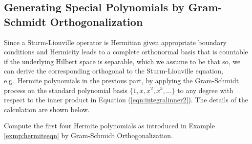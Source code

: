 \subsection{Generating Special Polynomials by Gram-Schmidt Orthogonalization}

Since a Sturm-Liouville operator is Hermitian given appropriate boundary conditions and Hermicity leads to a complete orthonormal basis that is countable if the underlying Hilbert space is separable, which we assume to be that so, we can derive the corresponding orthogonal  to the Sturm-Liouville equation, e.g.\ Hermite polynomials in the previous part, by applying the Gram-Schmidt process on the standard polynomial basis $\{1, x, x^2, x^3, \ldots\}$ to any degree with respect to the inner product in Equation (\ref{eqn:integralinner2}). The details of the calculation are shown below.
\begin{exmp}
Compute the first four Hermite polynomials as introduced in Example \ref{exmp:hermiteeqn} by Gram-Schmidt Orthogonalization.
\end{exmp}
